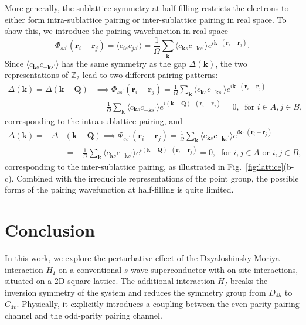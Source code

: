 \documentclass[11pt]{article}
\begin{document}
More generally, the sublattice symmetry at half-filling restricts the electrons to either form
intra-sublattice pairing or inter-sublattice pairing in real space. To show this, we introduce
the pairing wavefunction in real space
\begin{equation}\label{eq:pairing_real}
\Phi_{s s^\prime}(\bm r_i - \bm r_j) = \langle c_{i s} c_{j s^\prime} \rangle
= \frac{1}{\Omega} \sum_{\bm k} \langle c_{\bm k s} c_{-\bm k s^\prime} \rangle
e^{i\bm k \cdot(\bm r_i - \bm r_j)}.
\end{equation}
Since $\langle c_{\bm k s} c_{-\bm k s^\prime} \rangle$ has the same symmetry as the gap $\Delta(\bm k)$,
the two representations of $\mathbb{Z}_2$ lead to two different pairing patterns:
\begin{equation}
\begin{aligned}
    \Delta(\bm k) = \Delta(\bm k - \bm Q)&\implies
\Phi_{s s^\prime}(\bm r_i - \bm r_j) =
\frac{1}{\Omega} \sum_{\bm k} \langle c_{\bm k s} c_{-\bm k s^\prime} \rangle
e^{i\bm k \cdot(\bm r_i - \bm r_j)}\\
&= \frac{1}{\Omega} \sum_{\bm k} \langle c_{\bm k s} c_{-\bm k s^\prime} \rangle
e^{i(\bm k- \bm Q)\cdot(\bm r_i - \bm r_j)} = 0,\  \text{ for } i\in A, j \in B,
\end{aligned}
\end{equation}
corresponding to the intra-sublattice pairing, and
\begin{equation}
\begin{aligned}
    \Delta(\bm k) = -\Delta&(\bm k - \bm Q)\implies
\Phi_{s s^\prime}(\bm r_i - \bm r_j) =
\frac{1}{\Omega} \sum_{\bm k} \langle c_{\bm k s} c_{-\bm k s^\prime} \rangle
e^{i\bm k \cdot(\bm r_i - \bm r_j)}\\
&= -\frac{1}{\Omega} \sum_{\bm k} \langle c_{\bm k s} c_{-\bm k s^\prime} \rangle
e^{i(\bm k- \bm Q)\cdot(\bm r_i - \bm r_j)} = 0,\  \text{ for } i, j\in A \text{ or } i, j \in B,
\end{aligned}
\end{equation}
corresponding to the inter-sublattice pairing, as illustrated in Fig.~\ref{fig:lattice}(b-c).
Combined with the irreducible representations of the point group, the possible forms of the
pairing wavefunction at half-filling is quite limited.
\section{Conclusion}
In this work, we explore the perturbative effect of the Dzyaloshinsky-Moriya interaction $H_I$
on a conventional $s$-wave superconductor with on-site interactions, situated on a 2D square lattice.
The additional interaction $H_I$ breaks the inversion symmetry of the system and reduces the
symmetry group from $D_{4h}$ to $C_{4v}$. Physically, it explicitly introduces a coupling between
the even-parity pairing channel and the odd-parity pairing channel.
\end{document}
